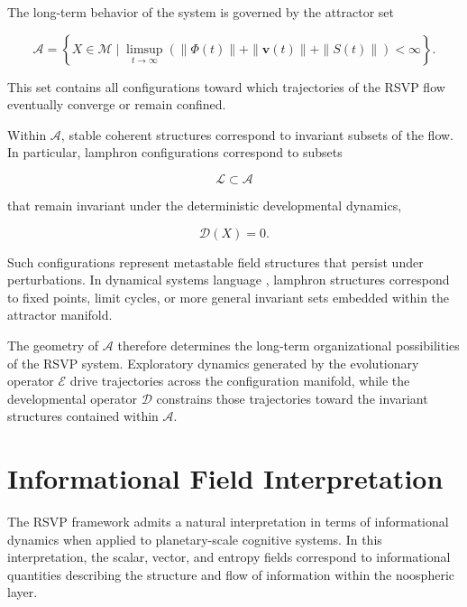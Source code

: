 \documentclass[12pt]{article}
\begin{document}
The long-term behavior of the system is governed by the attractor set

\begin{equation}
\mathcal{A} =
\left\{
X \in \mathcal{M}
\mid
\limsup_{t\to\infty}
\left(
\|\Phi(t)\| +
\|\mathbf{v}(t)\| +
\|S(t)\|
\right)
< \infty
\right\}.
\label{eq:attractor_set}
\end{equation}

This set contains all configurations toward which trajectories of the RSVP flow eventually converge or remain confined.

Within $\mathcal{A}$, stable coherent structures correspond to invariant subsets of the flow. In particular, lamphron configurations correspond to subsets

\begin{equation}
\mathcal{L} \subset \mathcal{A}
\end{equation}

that remain invariant under the deterministic developmental dynamics,

\begin{equation}
\mathcal{D}(X) = 0 .
\end{equation}

Such configurations represent metastable field structures that persist under perturbations. In dynamical systems language \cite{strogatz1994}, lamphron structures correspond to fixed points, limit cycles, or more general invariant sets embedded within the attractor manifold.

The geometry of $\mathcal{A}$ therefore determines the long-term organizational possibilities of the RSVP system. Exploratory dynamics generated by the evolutionary operator $\mathcal{E}$ drive trajectories across the configuration manifold, while the developmental operator $\mathcal{D}$ constrains those trajectories toward the invariant structures contained within $\mathcal{A}$.

\section{Informational Field Interpretation}
\label{app:infofield}

The RSVP framework admits a natural interpretation in terms of informational dynamics when applied to planetary-scale cognitive systems. In this interpretation, the scalar, vector, and entropy fields correspond to informational quantities describing the structure and flow of information within the noospheric layer.
\end{document}
